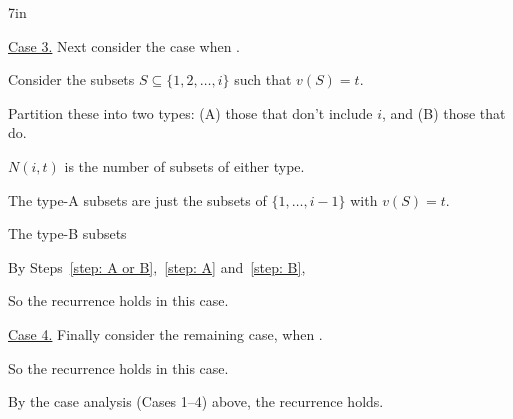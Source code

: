 \begin{answerBox}{7in}
\begin{longFormProof}
    \begin{block}
      \step \underline{Case 3.}  Next consider the case when \BLUE{\REPLACEME}.

      \step Consider the subsets $S\subseteq \{1,2,\ldots,i\}$ such that $v(S) = t$.

      \step Partition these into two types: (A) those that don't include $i$, and (B) those that do.

      \step\label{step: A or B} $N(i, t)$ is the number of subsets of either type.

      \smallskip 
      
      \step The type-A subsets are just the subsets of $\{1,\ldots,i-1\}$ with $v(S) = t$.

      \begin{blue}
        
        \step\label{step: A}
        \REPLACEME

        \smallskip

        \step The type-B subsets \REPLACEME

        \step\label{step: B}  \REPLACEME
        \smallskip 

        \step By Steps~\ref{step: A or B},~\ref{step: A} and~\ref{step: B}, \REPLACEME

      \end{blue}

      \step So the recurrence holds in this case.
    \end{block}

    \medskip 

    \begin{block}
      \step \underline{Case 4.}  Finally consider the remaining case, when \BLUE{\REPLACEME}.

      \begin{blue}
        
        \step \REPLACEME

        \step \REPLACEME

        \step \REPLACEME

      \end{blue}

      \step So the recurrence holds in this case. 

    \end{block}

    \medskip 

    \step By the case analysis (Cases 1--4) above, the recurrence holds.

  \end{longFormProof}

\end{answerBox}



